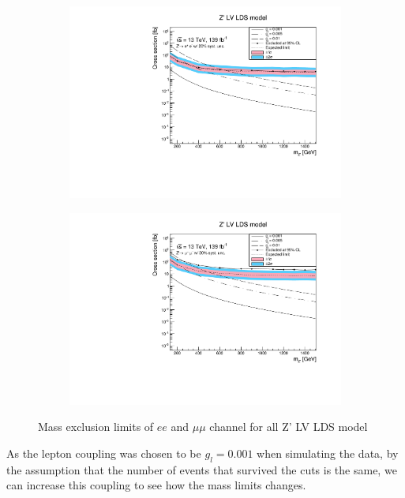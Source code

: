 \documentclass[12pt, a4paper]{book}
\begin{document}
\begin{figure}[!ht]
	\centering
   \begin{subfigure}[b]{0.49\textwidth}
      \centering
      \includegraphics[width=1\textwidth]{Limits/LV_LDS/mass_exclusion_ee.pdf}
      \end{subfigure}
   \hfill
   \begin{subfigure}[b]{0.49\textwidth}
      \centering
      \includegraphics[width=1\textwidth]{Limits/LV_LDS/mass_exclusion_uu.pdf}
      \end{subfigure}
   \caption{Mass exclusion limits of $ee$ and $\mu\mu$ channel for all Z' LV LDS model}\label{fig:LV_LDS_exclusion_ee_uu}
\end{figure}
As the lepton coupling was chosen to be $g_l=0.001$ when simulating the data, by the assumption that the number of events that survived the cuts is the same, we can increase this coupling to see how the mass limits changes.
\end{document}
